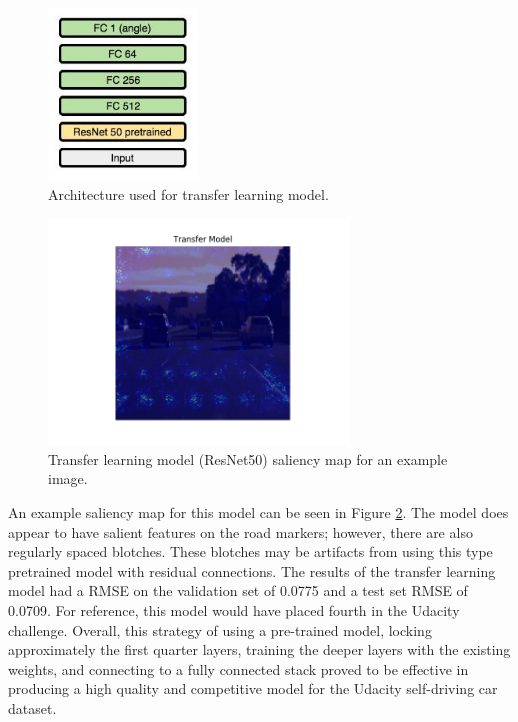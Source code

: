 \documentclass[10pt,twocolumn,letterpaper]{article}
\begin{document}
\begin{figure}[!htb!]
	\includegraphics[width=4cm]{resnet50trans.JPG}
	\centering
	\caption{Architecture used for transfer learning model.}
	\label{resnet50}
\end{figure}

 \begin{figure}[!htb]
	\includegraphics[width=8cm]{resnet50trans_saliency.png}
	\centering
	\caption{Transfer learning model (ResNet50) saliency map for an example image.}
	\label{resnet50_saliency}
\end{figure}

An example saliency map for this model can be seen in Figure \ref{resnet50_saliency}. The model does appear to have salient features on the road markers; however, there are also regularly spaced blotches. These blotches may be artifacts from using this type pretrained model with residual connections. The results of the transfer learning model had a RMSE on the validation set of 0.0775 and a test set RMSE of 0.0709. For reference, this model would have placed fourth in the Udacity challenge. Overall, this strategy of using a pre-trained model, locking approximately the first quarter layers, training the deeper layers with the existing weights, and connecting to a fully connected stack proved to be effective in producing a high quality and competitive model for the Udacity self-driving car dataset.
\end{document}
